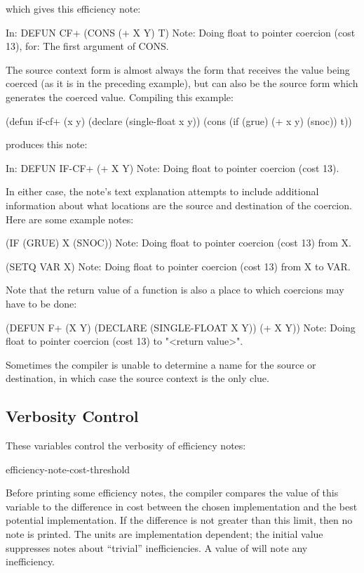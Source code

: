 which gives this efficiency note:

\begin{example}
In: DEFUN CF+
  (CONS (+ X Y) T)
Note: Doing float to pointer coercion (cost 13), for:
      The first argument of CONS.
\end{example}

The source context form is almost always the form that receives the value being
coerced (as it is in the preceding example), but can also be the source form
which generates the coerced value.  Compiling this example:

\begin{lisp}
(defun if-cf+ (x y)
  (declare (single-float x y))
  (cons (if (grue) (+ x y) (snoc)) t))
\end{lisp}

produces this note:

\begin{example}
In: DEFUN IF-CF+
  (+ X Y)
Note: Doing float to pointer coercion (cost 13).
\end{example}

In either case, the note's text explanation attempts to include
additional information about what locations are the source and
destination of the coercion.  Here are some example notes:
\begin{example}
  (IF (GRUE) X (SNOC))
Note: Doing float to pointer coercion (cost 13) from X.

  (SETQ VAR X)
Note: Doing float to pointer coercion (cost 13) from X to VAR.
\end{example}
Note that the return value of a function is also a place to which coercions may
have to be done:
\begin{example}
  (DEFUN F+ (X Y) (DECLARE (SINGLE-FLOAT X Y)) (+ X Y))
Note: Doing float to pointer coercion (cost 13) to "<return value>".
\end{example}
Sometimes the compiler is unable to determine a name for the source or
destination, in which case the source context is the only clue.


\subsection{Verbosity Control}

These variables control the verbosity of efficiency notes:

\begin{defvar}{}{efficiency-note-cost-threshold}
  
  Before printing some efficiency notes, the compiler compares the
  value of this variable to the difference in cost between the chosen
  implementation and the best potential implementation.  If the
  difference is not greater than this limit, then no note is printed.
  The units are implementation dependent; the initial value suppresses
  notes about ``trivial'' inefficiencies.  A value of  will
  note any inefficiency.
\end{defvar}

